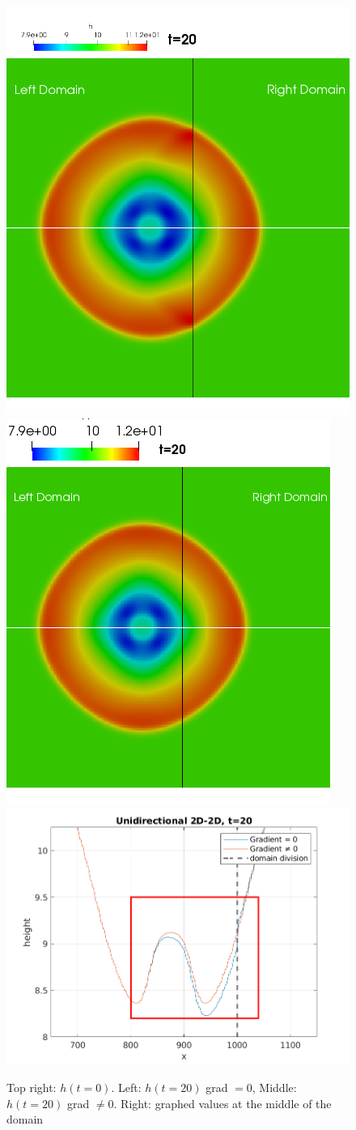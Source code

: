 \begin{frame}
\begin{figure}[htp]
\centering
\includegraphics[width=.25\textwidth]{./Resources/Images/unidirectional20_g_0.png}\hfill
\includegraphics[width=.25\textwidth]{./Resources/Images/unidirectional20_g_bueno.png}\hfill
\includegraphics[width=.4\textwidth]{./Resources/Images/unidirectional_graph.png}

\caption{Top right: $h(t=0)$. Left: $h(t=20)$ grad $=0$, Middle: $h(t=20)$ grad $\neq0$. Right: graphed values at the middle of the domain}
\end{figure}

\end{frame}


